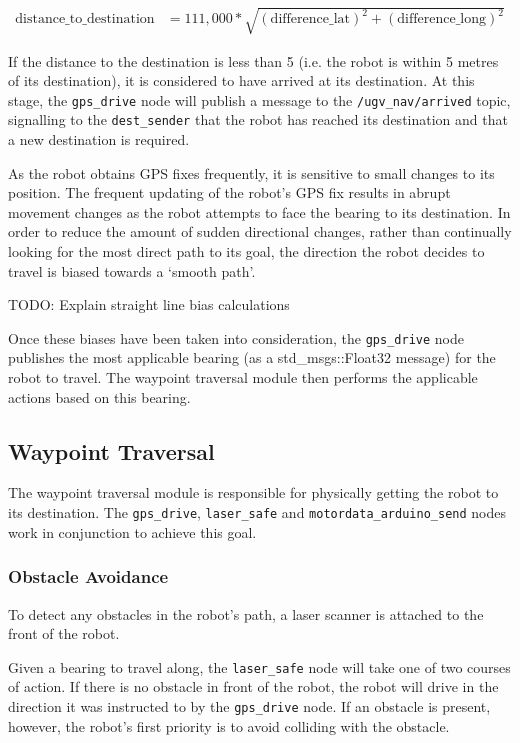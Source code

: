 \documentclass[titlepage,12pt,a4paper]{article}
\begin{document}

\begin{align*}
	\text{distance\_to\_destination}	&= 	111,000 * \sqrt{(\text{difference\_lat})^2 + (\text{difference\_long})^2}
\end{align*}

If the distance to the destination is less than 5 (i.e. the robot is within 5 metres of its destination), it is considered to have arrived at its destination. At this stage, the \verb|gps_drive| node will publish a message to the \verb|/ugv_nav/arrived| topic, signalling to the \verb|dest_sender| that the robot has reached its destination and that a new destination is required.




As the robot obtains GPS fixes frequently, it is sensitive to small changes to its position. The frequent updating of the robot's GPS fix results in abrupt movement changes as the robot attempts to face the bearing to its destination. In order to reduce the amount of sudden directional changes, rather than continually looking for the most direct path to its goal, the direction the robot decides to travel is biased towards a `smooth path'.


TODO: Explain straight line bias calculations 


Once these biases have been taken into consideration, the \verb|gps_drive| node publishes the most applicable bearing (as a std\_msgs::Float32 message) for the robot to travel. The waypoint traversal module then performs the applicable actions based on this bearing.

\subsection{Waypoint Traversal}
The waypoint traversal module is responsible for physically getting the robot to its destination. The \verb|gps_drive|, \verb|laser_safe| and \verb|motordata_arduino_send| nodes work in conjunction to achieve this goal.

\subsubsection{Obstacle Avoidance}
To detect any obstacles in the robot's path, a laser scanner is attached to the front of the robot.

Given a bearing to travel along, the \verb|laser_safe| node will take one of two courses of action. If there is no obstacle in front of the robot, the robot will drive in the direction it was instructed to by the \verb|gps_drive| node. If an obstacle is present, however, the robot's first priority is to avoid colliding with the obstacle. 
\end{document}
